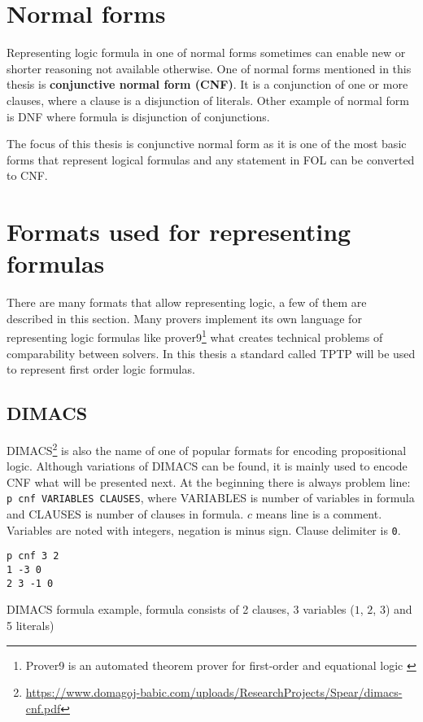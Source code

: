 \section{Normal forms}

Representing logic formula in one of normal forms sometimes can enable new or shorter reasoning not available otherwise. One of normal forms mentioned in this thesis is \textbf{conjunctive normal form (CNF)}. It is a conjunction of one or more clauses, where a clause is a disjunction of literals. Other example of normal form is \gls{DNF} where formula is disjunction of conjunctions.

The focus of this thesis is conjunctive normal form as it is one of the most basic forms that represent logical formulas and any statement in \gls{FOL} can be converted to CNF.

\section{Formats used for representing formulas}

There are many formats that allow representing logic, a few of them are described in this section. Many provers implement its own language for representing logic formulas like prover9\footnote{Prover9 is an automated theorem prover for first-order and equational logic \cite{prover9-mace4}} what creates technical problems of comparability between solvers. In this thesis a standard called \gls{TPTP} will be used to represent first order logic formulas.

\subsection{DIMACS}

DIMACS\footnote{\url{https://www.domagoj-babic.com/uploads/ResearchProjects/Spear/dimacs-cnf.pdf}} is also the name of one of popular formats for encoding propositional logic. Although variations of DIMACS can be found, it is mainly used to encode CNF what will be presented next. At the beginning there is always problem line:
\texttt{p cnf VARIABLES CLAUSES},
where VARIABLES is number of variables in formula and CLAUSES is number of clauses in formula. $c$ means line is a comment. Variables are noted with integers, negation is minus sign. Clause delimiter is 
\texttt{0}. 

\begin{listing}[H]
\begin{verbatim}
p cnf 3 2
1 -3 0
2 3 -1 0
\end{verbatim}
  \caption{DIMACS formula example, formula consists of 2 clauses, 3 variables ($1$, $2$, $3$) and 5 literals)}
  \label{lis:DIMACSExample}
\end{listing}

